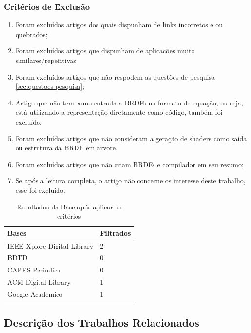 \documentclass[english, 
               brazil, 
               bsc] %
               {dcomp-abntex2}
\begin{document}
\subsubsection{Critérios de Exclusão}

\begin{enumerate}
  \item Foram excluídos artigos dos quais dispunham de links incorretos e ou quebrados;
  \item Foram excluídos artigos que dispunham de aplicacões muito similares/repetitivas;
  \item Foram excluídos artigos que não respodem as questões de pesquisa \ref{sec:questoes-pesquisa};
  \item Artigo que não tem como entrada a BRDFs no formato de equação, ou seja, está utilizando a representação diretamente como código, também foi excluído.
  \item Foram excluídos artigos que não consideram a geração de shaders como saída ou estrutura da BRDF em arvore.
  \item Foram excluídos artigos que não citam BRDFs e compilador em seu resumo;
  \item Se após a leitura completa, o artigo não concerne os interesse deste trabalho, esse foi excluído.
\end{enumerate}


\begin{table}[H]
\ABNTEXfontereduzida
  \caption[bases]{Resultados da Base após aplicar os critérios}
\label{tab-bases}
\begin{tabular}{p{6.6cm}|p{6.6cm}}
   \textbf{Bases}  & \textbf{Filtrados}\\
   \hline
    IEEE Xplore Digital Library
   & 2
    \\ \hline
    BDTD
    & 0
    \\ \hline
    CAPES Periodico
    & 0
    \\ \hline

  ACM Digital Library
  & 1
    \\ \hline
 Google Academico 
  & 1
\end{tabular}
\end{table}



\subsection{Descrição dos Trabalhos Relacionados}
\end{document}
